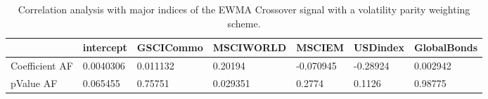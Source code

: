\begin{table}[H]
\centering
\begin{tabular}{lllllll}
& intercept & GSCICommo & MSCIWORLD & MSCIEM & USDindex & GlobalBonds \\ 
\hline 
Coefficient AF & 0.0040306 & 0.011132 & 0.20194 & -0.070945 & -0.28924 & 0.002942 \\ 
pValue AF & 0.065455 & 0.75751 & 0.029351 & 0.2774 & 0.1126 & 0.98775 \\ 
\hline
\end{tabular}
\caption{Correlation analysis with major indices of the EWMA Crossover signal with a volatility parity weighting scheme.}
\label{MBBSVPOQ_AFACTOR}
\end{table}